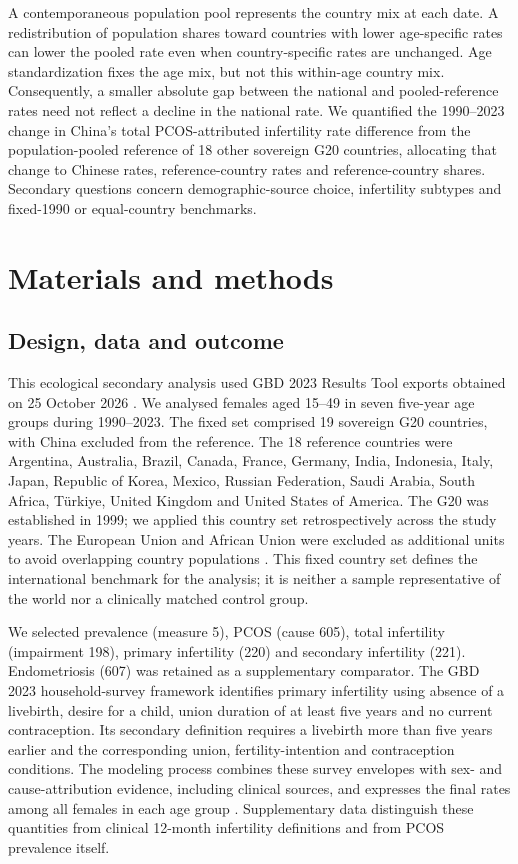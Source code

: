 \documentclass[11pt,a4paper]{article}
\begin{document}
A contemporaneous population pool represents the country mix at each date. A redistribution of population shares toward countries with lower age-specific rates can lower the pooled rate even when country-specific rates are unchanged. Age standardization fixes the age mix, but not this within-age country mix. Consequently, a smaller absolute gap between the national and pooled-reference rates need not reflect a decline in the national rate. We quantified the 1990--2023 change in China's total PCOS-attributed infertility rate difference from the population-pooled reference of 18 other sovereign G20 countries, allocating that change to Chinese rates, reference-country rates and reference-country shares. Secondary questions concern demographic-source choice, infertility subtypes and fixed-1990 or equal-country benchmarks.

\section{Materials and methods}
\subsection{Design, data and outcome}
This ecological secondary analysis used GBD 2023 Results Tool exports obtained on 25 October 2026 \citep{results}. We analysed females aged 15--49 in seven five-year age groups during 1990--2023. The fixed set comprised 19 sovereign G20 countries, with China excluded from the reference. The 18 reference countries were Argentina, Australia, Brazil, Canada, France, Germany, India, Indonesia, Italy, Japan, Republic of Korea, Mexico, Russian Federation, Saudi Arabia, South Africa, Türkiye, United Kingdom and United States of America. The G20 was established in 1999; we applied this country set retrospectively across the study years. The European Union and African Union were excluded as additional units to avoid overlapping country populations \citep{g20}. This fixed country set defines the international benchmark for the analysis; it is neither a sample representative of the world nor a clinically matched control group.

We selected prevalence (measure 5), PCOS (cause 605), total infertility (impairment 198), primary infertility (220) and secondary infertility (221). Endometriosis (607) was retained as a supplementary comparator. The GBD 2023 household-survey framework identifies primary infertility using absence of a livebirth, desire for a child, union duration of at least five years and no current contraception. Its secondary definition requires a livebirth more than five years earlier and the corresponding union, fertility-intention and contraception conditions. The modeling process combines these survey envelopes with sex- and cause-attribution evidence, including clinical sources, and expresses the final rates among all females in each age group \citep{gbd}. Supplementary data distinguish these quantities from clinical 12-month infertility definitions and from PCOS prevalence itself.
\end{document}
